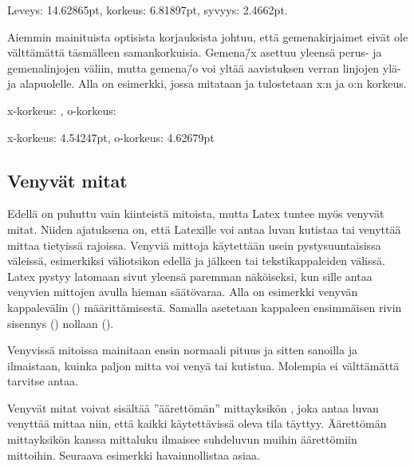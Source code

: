\begin{tulossis}
  Leveys: 14.62865pt, korkeus: 6.81897pt, syvyys: 2.4662pt.
\end{tulossis}

Aiemmin mainituista optisista korjauksista johtuu, että gemenakirjaimet
eivät ole välttämättä täsmälleen samankorkuisia. Gemena\=/x asettuu
yleensä perus- ja gemenalinjojen väliin, mutta gemena\=/o voi yltää
aavistuksen verran linjojen ylä- ja alapuolelle. Alla on esimerkki,
jossa mitataan ja tulostetaan x:n ja o:n korkeus.

\pagebreak[3]

\begin{koodilohkosis}
  \newlength{\korkeusx} \newlength{\korkeuso}
  x-korkeus: \the\korkeusx, o-korkeus: \the\korkeuso
\end{koodilohkosis}

\begin{tulossis}
  x-korkeus: 4.54247pt, o-korkeus: 4.62679pt
\end{tulossis}

\subsection{Venyvät mitat}

Edellä on puhuttu vain kiinteistä mitoista, mutta Latex tuntee myös
venyvät mitat. Niiden ajatuksena on, että Latexille voi antaa luvan
kutistaa tai venyttää mittaa tietyissä rajoissa. Venyviä mittoja
käytettään usein pystysuuntaisissa väleissä, esimerkiksi väliotsikon
edellä ja jälkeen tai tekstikappaleiden välissä. Latex pystyy latomaan
sivut yleensä paremman näköiseksi, kun sille antaa venyvien mittojen
avulla hieman säätövaraa. Alla on esimerkki venyvän kappalevälin
() määrittämisestä. Samalla asetetaan kappaleen
ensimmäisen rivin sisennys () nollaan
(\koodi{0em}).

\begin{koodilohkosis}
  \setlength{\parskip}{2ex plus 0.2ex minus 0.1ex}
  \setlength{\parindent}{0em}
\end{koodilohkosis}

Venyvissä mitoissa mainitaan ensin normaali pituus ja sitten sanoilla
 ja  ilmaistaan, kuinka paljon mitta voi venyä
tai kutistua. Molempia ei välttämättä tarvitse antaa.

Venyvät mitat voivat sisältää ''äärettömän'' mittayksikön ,
joka antaa luvan venyttää mittaa niin, että kaikki käytettävissä oleva
tila täyttyy. Äärettömän mittayksikön kanssa mittaluku ilmaisee
suhdeluvun muihin äärettömiin mittoihin. Seuraava esimerkki
havainnollistaa asiaa.


